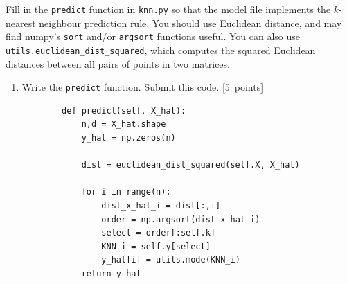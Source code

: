 \documentclass{article}
\newcommand{\blu}[1]{{\textcolor{blu}{#1}}}
\let\ask\blu
\newcommand\pts[1]{\textcolor{pointscolour}{[#1~points]}}
\begin{document}
    Fill in the \texttt{predict} function in \texttt{knn.py} so that the model file implements the $k$-nearest neighbour prediction rule.
    You should use Euclidean distance, and may find numpy's \texttt{sort} and/or \texttt{argsort} functions useful.
    You can also use \texttt{utils.euclidean\string_dist\string_squared}, which computes the squared Euclidean distances between all pairs of points in two matrices.
    \begin{enumerate}
        \item Write the \texttt{predict} function. \ask{Submit this code.} \pts{5}
        \begin{verbatim}
        def predict(self, X_hat):
            n,d = X_hat.shape
            y_hat = np.zeros(n)

            dist = euclidean_dist_squared(self.X, X_hat)
        
            for i in range(n):
                dist_x_hat_i = dist[:,i]
                order = np.argsort(dist_x_hat_i)
                select = order[:self.k]
                KNN_i = self.y[select]
                y_hat[i] = utils.mode(KNN_i)
            return y_hat

        \end{verbatim}
        

\end{enumerate}
\end{document}
